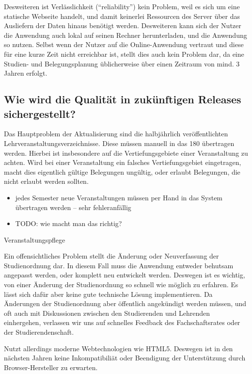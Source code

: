 \documentclass[ngerman]{article}
\begin{document}
Desweiteren ist Verlässlichkeit (``reliability'') kein Problem, weil es sich um eine statische Webseite handelt, und damit keinerlei Ressourcen des Server über das Ausliefern der Daten hinaus benötigt werden.
Desweiteren kann sich der Nutzer die Anwendung auch lokal auf seinen Rechner herunterladen, und die Anwendung so nutzen.
Selbst wenn der Nutzer auf die Online-Anwendung vertraut und diese für eine kurze Zeit nicht erreichbar ist, stellt dies auch kein Problem dar, da eine Studien- und Belegungsplanung üblicherweise über einen Zeitraum von mind. 3 Jahren erfolgt.

\subsection{Wie wird die Qualität in zukünftigen Releases sichergestellt?}

Das Hauptproblem der Aktualisierung sind die halbjährlich veröffentlichten Lehrveranstaltungsverzeichnisse.
Diese müssen manuell in das 180 übertragen werden.
Hierbei ist insbesondere auf die Vertiefungsgebiete einer Veranstaltung zu achten.
Wird bei einer Veranstaltung ein falsches Vertiefungsgebiet eingetragen, macht dies eigentlich gültige Belegungen ungültig, oder erlaubt Belegungen, die nicht erlaubt werden sollten.

\begin{itemize}
    \item
        jedes Semester neue Veranstaltungen müssen per Hand in das System übertragen werden -- sehr fehleranfällig
    \item
        TODO: wie macht man das richtig?
\end{itemize}

Veranstaltungspflege

Ein offensichtliches Problem stellt die Änderung oder Neuverfassung der Studienordnung dar.
In diesem Fall muss die Anwendung entweder behutsam angepasst werden, oder komplett neu entwickelt werden.
Deswegen ist es wichtig, von einer Änderung der Studienordnung so schnell wie möglich zu erfahren.
Es lässt sich dafür aber keine gute technische Lösung implementieren.
Da Änderungen der Studienordnung aber öffentlich angekündigt werden müssen, und oft auch mit Diskussionen zwischen den Studierenden und Lehrenden einhergehen, verlassen wir uns auf schnelles Feedback des Fachschaftsrates oder der Studierendenschaft.

 Nutzt allerdings moderne Webtechnologien wie HTML5.
Deswegen ist in den nächsten Jahren keine Inkompatibiliät oder Beendigung der Unterstützung durch Browser-Hersteller zu erwarten.
\end{document}
